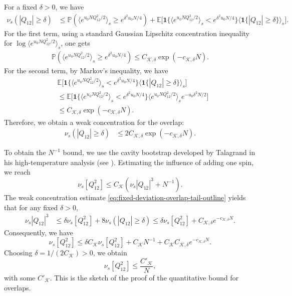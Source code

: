 \documentclass[11pt]{article}
\numberwithin{equation}{section}
\newcommand{\1}{\mathbf 1}
\newcommand{\cK}{\mathcal K}
\begin{document}
For a fixed $\delta>0$, we have 
\begin{align*}
        \nu_s\left(
|Q_{12}|\ge\delta
\right)&\le \mathbb P( \langle e^{u_0 N Q_{12}^2/2} \rangle_s\ge e^{\delta^2 u_0 N/4}) + \mathbb E \Big[\mathbf{1}\{\langle e^{u_0 N Q_{12}^2/2} \rangle_s<e^{\delta^2 u_0 N/4}\}\langle \mathbf{1}\{|Q_{12}|\ge\delta\}\rangle_s\Big].
\end{align*}
For the first term,  using a standard Gaussian Lipschitz concentration inequality for $\log \langle e^{u_0 N Q_{12}^2/2} \rangle_s$,  one gets 
\begin{align*}
\mathbb P( \langle e^{u_0 N Q_{12}^2/2} \rangle_s\ge e^{\delta^2 u_0 N/4})\leq C_{\mathcal K,\delta}
\exp(-c_{\mathcal K,\delta}N).
\end{align*}
For the  second term, by Markov's inequality, we have
\begin{align*}
    &\mathbb E \Big[\mathbf{1}\{\langle e^{u_0 N Q_{12}^2/2} \rangle_s<e^{\delta^2 u_0 N/4}\}\langle \mathbf{1}\{|Q_{12}|\ge\delta\}\rangle_s\Big]\\
    &\leq \mathbb E \Big[\mathbf{1}\{\langle e^{u_0 N Q_{12}^2/2} \rangle_s<e^{\delta^2 u_0 N/4}\}\langle e^{u_0 N Q_{12}^2/2}\rangle_s e^{-u_0 \delta^2 N/2}\Big]\\
&\le
C_{\mathcal K,\delta}
\exp(-c_{\mathcal K,\delta}N).
\end{align*}
Therefore, we obtain a weak concentration for the overlap: 
\begin{equation}
\begin{split}
    \nu_s\left(
|Q_{12}|\ge\delta
\right)&\leq 
2 C_{\mathcal K,\delta}
\exp(-c_{\mathcal K,\delta}N).
\label{eq:fixed-deviation-overlap-tail-outline}
\end{split}
\end{equation}

To obtain the $N^{-1}$ bound, we use
the cavity bootstrap developed by  Talagrand in his high-temperature analysis (see \cite[Chapter~1]{Talagrand}).
Estimating the influence of adding one spin, we reach
\begin{equation}
\nu_s[Q_{12}^2] \leq C_\cK 
 \left(
\nu_s|Q_{12}|^3+N^{-1}
\right).
\label{eq:cavity-remainder-outline}
\end{equation}
The weak concentration estimate \eqref{eq:fixed-deviation-overlap-tail-outline} yields that for any fixed
$\delta >0$,
\begin{align}
\nu_s|Q_{12}|^3
&\le
\delta\nu_s[Q_{12}^2]
+
8\nu_s\left(|Q_{12}|\ge\delta\right) \le
\delta \nu_s[Q_{12}^2]+
C_{\mathcal K,\delta}e^{-c_{\mathcal K,\delta}N}.
\label{eq:cubic-bootstrap-outline}
\end{align}
Consequently, we have
\[
\nu_s[Q_{12}^2] \leq \delta C_\cK \nu_s[Q_{12}^2] +  C_\cK N^{-1} + C_\cK C_{\cK,\delta}e^{-c_{\mathcal K,\delta}N}.
\]
Choosing $\delta=1/(2C_\cK)>0$, we obtain
\begin{equation}
\nu_s[Q_{12}^2]
\le
\frac{C'_{\mathcal K}}{N},
\label{eq:optimal-overlap-bound-outline}
\end{equation}
with some $C'_\cK$.
This is the sketch of the proof of the quantitative bound for overlaps.
\end{document}
